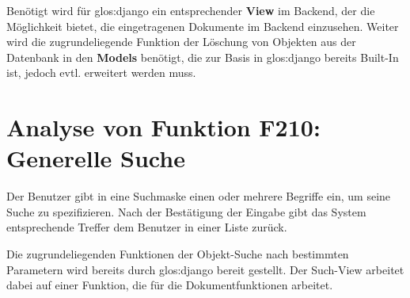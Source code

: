 
Benötigt wird für \gls{glos:django} ein entsprechender \textbf{View} im Backend, der die
Möglichkeit bietet, die eingetragenen Dokumente im Backend einzusehen. Weiter
wird die zugrundeliegende Funktion der Löschung von Objekten aus der Datenbank
in den \textbf{Models} benötigt, die zur Basis in \gls{glos:django} bereits Built-In ist,
jedoch evtl. erweitert werden muss.

\section{Analyse von Funktion F210: Generelle Suche}
Der Benutzer gibt in eine Suchmaske einen oder mehrere Begriffe ein, um seine
Suche zu spezifizieren. Nach der Bestätigung der Eingabe gibt das System
entsprechende Treffer dem Benutzer in einer Liste zurück.


Die zugrundeliegenden Funktionen der Objekt-Suche nach bestimmten Parametern
wird bereits durch \gls{glos:django} bereit gestellt. Der Such-View arbeitet dabei auf
einer Funktion, die für die Dokumentfunktionen arbeitet.
